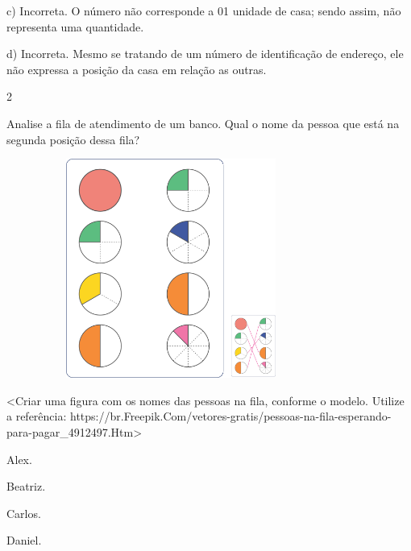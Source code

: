\begin{escolha}
\begin{escolha}
{c) Incorreta. O número não corresponde a 01 unidade de casa; sendo assim, não representa uma quantidade.

d) Incorreta. Mesmo se tratando de um número de identificação de
endereço, ele não expressa a posição da casa em relação as outras.

\num{2}

Analise a fila de atendimento de um banco. Qual o nome da pessoa que
está na segunda posição dessa fila?

\includegraphics[width=4.25000in,height=2.83333in]{media/image106.png}

\textless{}Criar uma figura com os nomes das pessoas na fila, conforme o
modelo. Utilize a referência:
https://br.Freepik.Com/vetores-gratis/pessoas-na-fila-esperando-para-pagar\_4912497.Htm\textgreater{}

\begin{escolha}
\item Alex.

\item Beatriz.

\item Carlos.

\item Daniel.
\end{escolha}

}
\end{escolha}
\end{escolha}
